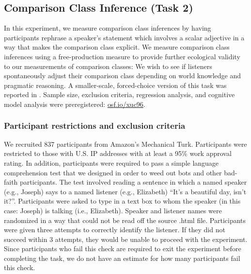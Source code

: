\documentclass[doc]{apa6}
\begin{document}
\subsection{Comparison Class Inference (Task 2)}

In this experiment, we measure comparison class inferences by having participants rephrase a speaker's statement which involves a scalar adjective in a way that makes the comparison class explicit.
We measure comparison class inferences using a free-production measure to provide further ecological validity to our measurements of comparison classes: We wish to see if listeners spontaneously adjust their comparison class depending on world knowledge and pragmatic reasoning.
A smaller-scale, forced-choice version of this task was reported in .  
Sample size, exclusion criteria, regression analysis, and cognitive model analysis were preregistered: \url{osf.io/xuc96}.

\subsubsection{Participant restrictions and exclusion criteria}

We recruited 837 participants from Amazon's Mechanical Turk. 
Participants were restricted to those with U.S. IP addresses with at least a 95\% work approval rating. 
In addition, participants were required to pass a simple language comprehension test that we designed in order to weed out bots and other bad-faith participants. 
The test involved reading a sentence in which a named speaker (e.g., Joseph) says to a named listener (e.g., Elizabeth) ``It's a beautiful day, isn't it?''. 
Participants were asked to type in a text box to whom the speaker (in this case: Joseph) is talking (i.e., Elizabeth).
Speaker and listener names were randomized in a way that could not be read off the source .html file.
Participants were given three attempts to correctly identify the listener. 
If they did not succeed within 3 attempts, they would be unable to proceed with the experiment.
Since participants who fail this check are required to exit the experiment before completing the task, we do not have an estimate for how many participants fail this check. 
\end{document}
